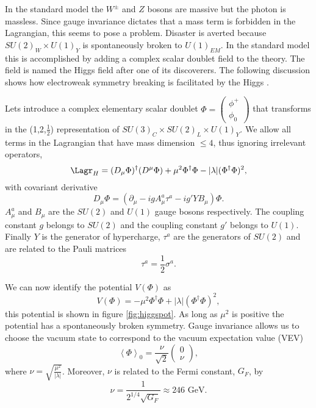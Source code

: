 
In the standard model the $W^{\pm}$ and $Z$ bosons are massive but the photon is massless.
Since gauge invariance dictates that a mass term is forbidden in the Lagrangian, this seems to pose a problem.
Disaster is averted because $SU(2)_W \times U(1)_Y$ is spontaneously broken to $U(1)_{EM}$.
In the standard model this is accomplished by adding a complex scalar doublet field to the theory.
The field is named the Higgs field after one of its discoverers.
The following discussion shows how electroweak symmetry breaking is facilitated by the Higgs \cite{Quigg:ds52, Quigg:ds53, peskin:book}.

Lets introduce a complex elementary scalar doublet $\Phi=\left(\begin{matrix}\phi^+\\\phi_0\end{matrix}\right)$ that transforms in the (1,2,$\frac{1}{2}$) representation of $SU(3)_C\times SU(2)_L\times U(1)_Y$.
We allow all terms in the Lagrangian that have mass dimension $\leq 4$, thus ignoring irrelevant operators,
\begin{equation}
  \Lagr_H=(D_\mu\Phi)^\dagger(D^\mu\Phi)+\mu^2\Phi^\dagger\Phi-|\lambda|(\Phi^\dagger\Phi)^2,
\end{equation}
with covariant derivative
\begin{equation}
  D_\mu\Phi=(\partial_\mu-igA^a_\mu\tau^a-ig'YB_\mu)\Phi.
\end{equation}
$A^a_\mu$ and $B_\mu$ are the $SU(2)$ and $U(1)$ gauge bosons respectively.
The coupling constant $g$ belongs to $SU(2)$ and the coupling constant $g'$ belongs to $U(1)$.
Finally $Y$ is the generator of hypercharge, $\tau^a$ are the generators of $SU(2)$ and are related to the Pauli matrices
\begin{equation}
  \tau^a=\frac{1}{2}\sigma^a.
\end{equation}

We can now identify the potential $V(\Phi)$ as
\begin{equation}
  V(\Phi)=-\mu^2\Phi^\dagger\Phi+|\lambda|(\Phi^\dagger\Phi)^2,
\end{equation}
this potential is shown in figure \ref{fig:higgspot}.
As long as $\mu^2$ is positive the potential has a spontaneously broken symmetry.
Gauge invariance allows us to choose the vacuum state to correspond to the vacuum expectation value (VEV)
\begin{equation}
  \left<\Phi\right>_0=\frac{\nu}{\sqrt{2}}\left(\begin{matrix}0 \\ \nu\end{matrix}\right),
\end{equation}
where $\nu=\sqrt{\frac{\mu^2}{|\lambda|}}$.
Moreover, $\nu$ is related to the Fermi constant, $G_F$, by
\begin{equation}
  \nu=\frac{1}{2^{1/4}\sqrt{G_F}}\approx 246 \mbox{ GeV}.
\end{equation}

